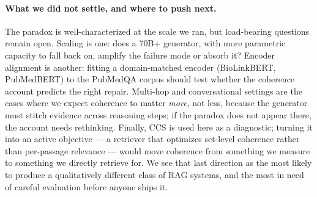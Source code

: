 \paragraph{What we did not settle, and where to push next.}
The paradox is well-characterized at the scale we ran, but load-bearing
questions remain open. Scaling is one: does a 70B+ generator, with more
parametric capacity to fall back on, amplify the failure mode or absorb
it? Encoder alignment is another: fitting a domain-matched encoder
(BioLinkBERT, PubMedBERT) to the PubMedQA corpus should test whether
the coherence account predicts the right repair. Multi-hop and
conversational settings are the cases where we expect coherence to
matter \emph{more}, not less, because the generator must stitch evidence
across reasoning steps; if the paradox does not appear there, the
account needs rethinking. Finally, CCS is used here as a diagnostic;
turning it into an active objective — a retriever that optimizes
set-level coherence rather than per-passage relevance — would move
coherence from something we measure to something we directly retrieve
for. We see that last direction as the most likely to produce a
qualitatively different class of RAG systems, and the most in need of
careful evaluation before anyone ships it.
